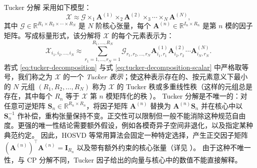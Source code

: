 \documentclass[11pt]{article}
\newcommand{\R}{\mathbb{R}}
\newcommand{\ten}[1]{\mathcal{#1}}
\newcommand{\mat}[1]{\mathbf{#1}}
\begin{document}



Tucker 分解 \cite{tucker1966some} 采用如下模型：
\begin{equation}
\label{eq:tucker-decomposition}
\ten{X} \approx \ten{G}\times_1\mat{A}^{(1)}\times_2\mat{A}^{(2)} \times_3 \cdots \times_N\mat{A}^{(N)},
\end{equation}
其中 $\ten{G} \in \R^{R_1 \times R_2 \times \cdots \times R_N}$ 是 $N$ 阶核心张量，每个 $\mat{A}^{(n)} \in \R^{I_n \times R_n}$ 是第 $n$ 模的因子矩阵。写成标量形式，该分解将 $\ten{X}$ 的每个元素表示为：
\begin{equation}
\label{eq:tucker-decomposition-scalar}
\ten{X}_{i_1, i_2, \dots, i_N} \approx \sum_{r_1=1, \dots, r_N=1}^{R_1, \dots, R_N}
\ten{G}_{r_1, r_2, \dots, r_N} \mat{A}^{(1)}_{i_1, r_1} \mat{A}^{(2)}_{i_2, r_2} \cdots \mat{A}^{(N)}_{i_N, r_N}.
\end{equation}
若式 \eqref{eq:tucker-decomposition} 与式 \eqref{eq:tucker-decomposition-scalar} 中严格取等号，我们称之为 $\ten{X}$ 的一个 \emph{Tucker 表示}；使这种表示存在的、按元素意义下最小的 $N$ 元组 $(R_1, R_2, \dots, R_N)$ 称为 $\ten{X}$ 的 Tucker 秩或多重线性秩（这样的元组总是存在，其中每个 $R_n$ 等于 $\ten{X}$ 第 $n$ 模矩阵化的秩 \cite{kolda2009tensor}）。
Tucker 分解是不唯一的：对任意可逆矩阵 $\mat{S}_n \in \R^{R_n \times R_n}$，将因子矩阵 $\mat{A}^{(n)}$ 替换为 $\mat{A}^{(n)}\mat{S}_n$ 并在核心中以 $\mat{S}_n^{-1}$ 作补偿，重构张量保持不变。正交性可以限制但一般不能消除这种规范自由度。更强的唯一性结论需要额外假设，例如各模奇异子空间非退化，以及指定某种典范约定。
因此，HOSVD \cite{lathauwer2000hosvd} 等常用算法会固定一种特定选择，产生正交因子矩阵 $(\mat{A}^{(n)})^\top \mat{A}^{(n)} = \mat{I}_{R_n}$ 以及带有额外约束的核心张量（详见 \cite{lathauwer2000hosvd}）。
由于这种不唯一性，与 CP 分解不同，Tucker 因子给出的向量与核心中的数值不能直接解释。
\end{document}
